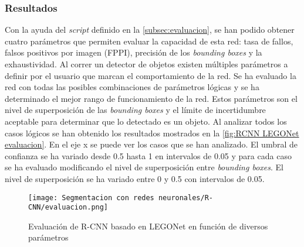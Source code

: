 \subsubsection*{Resultados}
Con la ayuda del \textit{script} definido en la \autoref{subsec:evaluacion}, se han podido obtener cuatro parámetros que permiten evaluar la capacidad de esta red: tasa de fallos, falsos positivos por imagen (FPPI), precisión de los \textit{bounding boxes} y la exhaustividad. Al correr un detector de objetos existen múltiples parámetros a definir por el usuario que marcan el comportamiento de la red. Se ha evaluado la red con todas las posibles combinaciones de parámetros lógicas y se ha determinado el mejor rango de funcionamiento de la red. Estos parámetros son el nivel de superposición de las \textit{bounding boxes} y el límite de incertidumbre aceptable para determinar que lo detectado es un objeto. Al analizar todos los casos lógicos se han obtenido los resultados mostrados en la \autoref{fig:RCNN LEGONet evaluacion}. En el eje x se puede ver los casos que se han analizado. El umbral de confianza se ha variado desde 0.5 hasta 1 en intervalos de 0.05 y para cada caso se ha evaluado modificando el nivel de superposición entre \textit{bounding boxes}. El nivel de superposición se ha variado entre 0 y 0.5 con intervalos de 0.05.

\begin{figure}[ht]  %
	\centering
	\texttt{[image: Segmentacion con redes neuronales/R-CNN/evaluacion.png]}
	\caption{Evaluación de R-CNN basado en LEGONet en función de diversos parámetros}
	\label{fig:RCNN LEGONet evaluacion}
\end{figure}

